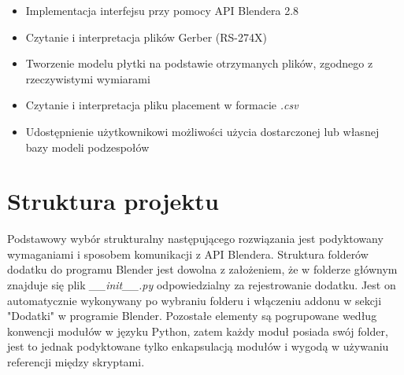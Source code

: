 \documentclass{xmgr}
\begin{document}
\begin{itemize}

\item Implementacja interfejsu przy pomocy API Blendera 2.8

\item Czytanie i interpretacja plików Gerber (RS-274X)

\item Tworzenie modelu płytki na podstawie otrzymanych plików, zgodnego z rzeczywistymi wymiarami

\item Czytanie i interpretacja pliku placement w formacie \emph{.csv}

\item Udostępnienie użytkownikowi możliwości użycia dostarczonej lub własnej bazy modeli podzespołów

\end{itemize}

\section {Struktura projektu}
Podstawowy wybór strukturalny następującego rozwiązania jest podyktowany wymaganiami i sposobem komunikacji z API Blendera. Struktura folderów dodatku do programu Blender jest dowolna z założeniem, że w folderze głównym znajduje się plik \emph{\_\_init\_\_.py} odpowiedzialny za rejestrowanie dodatku. Jest on automatycznie wykonywany po wybraniu folderu i włączeniu addonu w sekcji "Dodatki" w programie Blender. Pozostałe elementy są pogrupowane według konwencji modułów w języku Python, zatem każdy moduł posiada swój folder, jest to jednak podyktowane tylko enkapsulacją modułów i wygodą w używaniu referencji między skryptami.
\end{document}
